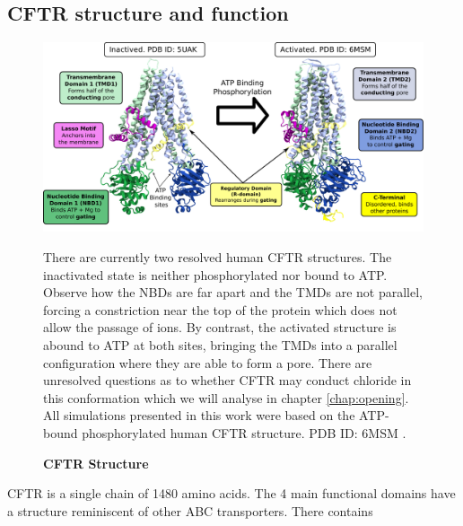 \subsection{CFTR structure and function}

\begin{figure}
	\begin{center}
	\includegraphics[width=\textwidth]{figures/CFTR_structure.pdf}
	\end{center}
	\label{CFTR_structure_domains}
	\captionsetup{singlelinecheck = false, justification=raggedright}
	\caption[CFTR Structure] {\textbf{CFTR Structure}}{There are currently two resolved human CFTR structures. The inactivated state is neither phosphorylated nor bound to ATP. Observe how the NBDs are far apart and the TMDs are not parallel, forcing a constriction near the top of the protein which does not allow the passage of ions. By contrast, the activated structure is abound to ATP at both sites, bringing the TMDs into a parallel configuration where they are able to form a pore. There are unresolved questions as to whether CFTR may conduct chloride in this conformation which we will analyse in chapter \ref{chap:opening}. All simulations presented in this work were based on the ATP-bound phosphorylated human CFTR structure. PDB ID: 6MSM \cite{zhang2018}.} 

\end{figure}
CFTR is a single chain of 1480 amino acids. The 4 main functional domains have a structure reminiscent of other ABC transporters. There  contains 

